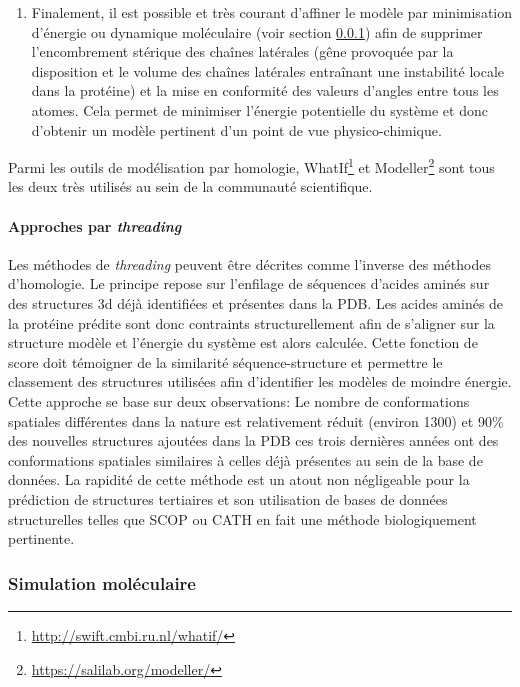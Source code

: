 \begin{enumerate}
	\item Finalement, il est possible et très courant d'affiner le modèle par minimisation d'énergie ou dynamique moléculaire (voir section \ref{simu}) afin de supprimer l'encombrement stérique des chaînes latérales (gêne provoquée par la disposition et le volume des chaînes latérales entraînant une instabilité locale dans la protéine) et la mise en conformité des valeurs d'angles entre tous les atomes. Cela permet de minimiser l'énergie potentielle du système et donc d'obtenir un modèle pertinent d'un point de vue physico-chimique.
\end{enumerate}

Parmi les outils de modélisation par homologie, WhatIf\footnote{\url{http://swift.cmbi.ru.nl/whatif/}} et Modeller\footnote{\url{https://salilab.org/modeller/}} sont tous les deux très utilisés au sein de la communauté scientifique.

\paragraph{Approches par \textit{threading}}

Les méthodes de \textit{threading} peuvent être décrites comme l'inverse des méthodes d'homologie. Le principe repose sur l'enfilage de séquences d'acides aminés sur des structures 3d déjà identifiées et présentes dans la PDB. Les acides aminés de la protéine prédite sont donc contraints structurellement afin de s'aligner sur la structure modèle et l'énergie du système est alors calculée. Cette fonction de score doit témoigner de la similarité séquence-structure et permettre le classement des structures utilisées afin d'identifier les modèles de moindre énergie.
Cette approche se base sur deux observations: Le nombre de conformations spatiales différentes dans la nature est relativement réduit (environ 1300) et 90\% des nouvelles structures ajoutées dans la PDB ces trois dernières années ont des conformations spatiales similaires à celles déjà présentes au sein de la base de données.
La rapidité de cette méthode est un atout non négligeable pour la prédiction de structures tertiaires et son utilisation de bases de données structurelles telles que SCOP ou CATH en fait une méthode biologiquement pertinente.

\subsubsection{Simulation moléculaire} \label{simu}

